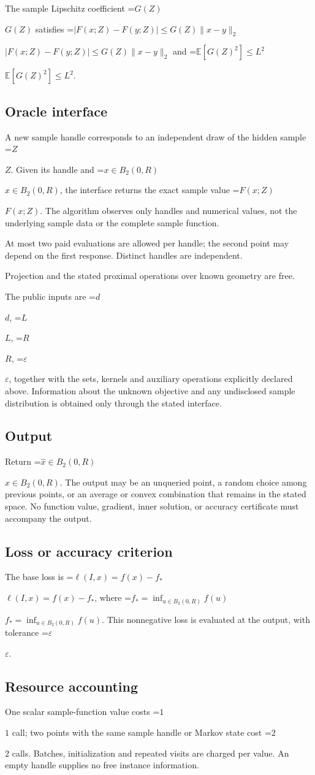 \documentclass[10pt,a4paper]{article}
\newcommand{\AtlasMath}[1]{\par\begingroup\centering\setbox0=\hbox{$\displaystyle #1$}\ifdim\wd0>1.4\linewidth\typeout{ATLAS WIDE FORMULA: \the\wd0}\fi\ifdim\wd0>\linewidth\resizebox{\linewidth}{!}{\box0}\else\box0\fi\par\endgroup}
\newcommand{\AtlasInlineMath}[1]{\begingroup\setbox0=\hbox{$#1$}\ifdim\wd0>.4\linewidth\endgroup\AtlasMath{#1}\else\endgroup$#1$\fi}
\begin{document}
The sample Lipschitz coefficient \AtlasInlineMath{G(Z)} satisfies \AtlasInlineMath{|F(x;Z)-F(y;Z)|\le G(Z)\|x-y\|_2} and \AtlasInlineMath{\mathbb{E}[G(Z)^2]\le L^2}.

\subsection{Oracle interface}
A new sample handle corresponds to an independent draw of the hidden sample \AtlasInlineMath{Z}. Given its handle and \AtlasInlineMath{x\in B_2(0,R)}, the interface returns the exact sample value \AtlasInlineMath{F(x;Z)}. The algorithm observes only handles and numerical values, not the underlying sample data or the complete sample function.

At most two paid evaluations are allowed per handle; the second point may depend on the first response. Distinct handles are independent.

Projection and the stated proximal operations over known geometry are free.

The public inputs are \AtlasInlineMath{d}, \AtlasInlineMath{L}, \AtlasInlineMath{R}, \AtlasInlineMath{\varepsilon}, together with the sets, kernels and auxiliary operations explicitly declared above. Information about the unknown objective and any undisclosed sample distribution is obtained only through the stated interface.

\subsection{Output}
Return \AtlasInlineMath{\widehat{x}\in B_2(0,R)}. The output may be an unqueried point, a random choice among previous points, or an average or convex combination that remains in the stated space. No function value, gradient, inner solution, or accuracy certificate must accompany the output.

\subsection{Loss or accuracy criterion}
The base loss is \AtlasInlineMath{\ell(I,x)=f(x)-f_*}, where \AtlasInlineMath{f_*=\inf_{u\in B_2(0,R)}f(u)}. This nonnegative loss is evaluated at the output, with tolerance \AtlasInlineMath{\varepsilon}.

\subsection{Resource accounting}
One scalar sample-function value costs \AtlasInlineMath{1} call; two points with the same sample handle or Markov state cost \AtlasInlineMath{2} calls. Batches, initialization and repeated visits are charged per value. An empty handle supplies no free instance information.
\end{document}
